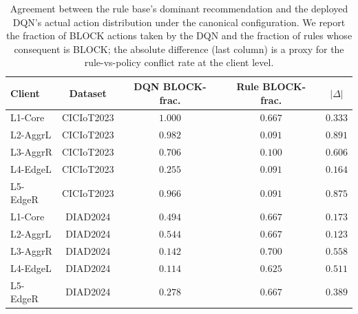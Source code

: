 \documentclass[ai,article,submit,moreauthors,pdftex]{Definitions/mdpi}
\newcommand{\rev}[1]{#1}
\begin{document}
\begin{table}[!htbp]
\centering
\rev{\caption{Agreement between the rule base's dominant recommendation and the deployed DQN's actual action distribution under the canonical configuration. We report the fraction of BLOCK actions taken by the DQN and the fraction of rules whose consequent is BLOCK; the absolute difference (last column) is a proxy for the rule-vs-policy conflict rate at the client level.}\label{tab:rule_dqn_agreement}}
\rev{\small
\begin{tabular}{@{}lcccc@{}}
\toprule
\textbf{Client} & \textbf{Dataset} & \textbf{DQN BLOCK-frac.} & \textbf{Rule BLOCK-frac.} & \textbf{$|\Delta|$} \\
\midrule
L1-Core   & CICIoT2023 & $1.000$ & $0.667$ & $0.333$ \\
L2-AggrL  & CICIoT2023 & $0.982$ & $0.091$ & $0.891$ \\
L3-AggrR  & CICIoT2023 & $0.706$ & $0.100$ & $0.606$ \\
L4-EdgeL  & CICIoT2023 & $0.255$ & $0.091$ & $0.164$ \\
L5-EdgeR  & CICIoT2023 & $0.966$ & $0.091$ & $0.875$ \\
\midrule
L1-Core   & DIAD2024   & $0.494$ & $0.667$ & $0.173$ \\
L2-AggrL  & DIAD2024   & $0.544$ & $0.667$ & $0.123$ \\
L3-AggrR  & DIAD2024   & $0.142$ & $0.700$ & $0.558$ \\
L4-EdgeL  & DIAD2024   & $0.114$ & $0.625$ & $0.511$ \\
L5-EdgeR  & DIAD2024   & $0.278$ & $0.667$ & $0.389$ \\
\bottomrule
\end{tabular}}
\end{table}
\end{document}
